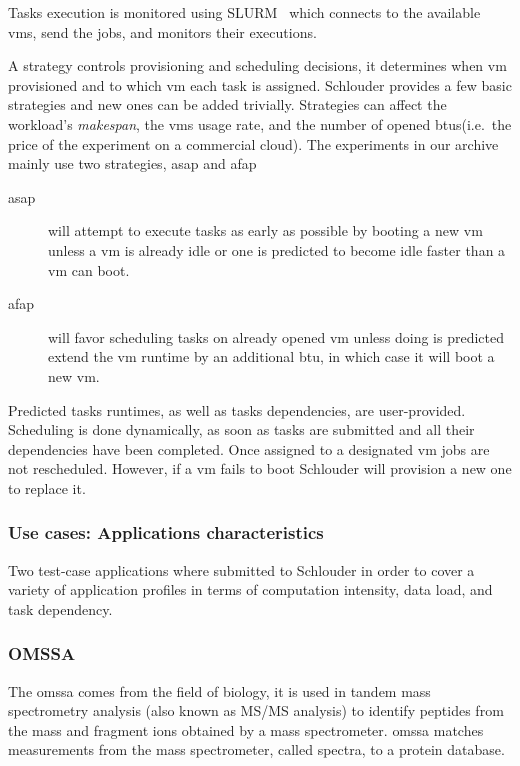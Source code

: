 \documentclass[a4paper,10pt]{article}
\begin{document}
Tasks execution  is monitored using  SLURM~\cite{YooJG03} which connects  to the
available \acp{vm}, send the jobs, and monitors their executions.

A strategy controls provisioning and scheduling decisions, it determines when
\ac{vm} provisioned and to which \ac{vm} each task is assigned. Schlouder
provides a few basic strategies and new ones can be added trivially. Strategies
can affect the workload's \emph{makespan}, the \acp{vm} usage rate, and the
number of opened \acp{btu}(i.e.\ the price of the experiment on a commercial
cloud). The experiments in our archive mainly use two strategies, \ac{asap} and
\ac{afap}

\begin{description}
	\item[\ac{asap}] will attempt to execute tasks as early as possible by
		booting a new \ac{vm} unless a \ac{vm} is already idle or one is
		predicted to become idle faster than a \ac{vm} can boot.
	\item[\ac{afap}] will favor scheduling tasks on already opened \ac{vm}
		unless doing is predicted extend the \ac{vm} runtime by an
		additional \ac{btu}, in which case it will boot a new \ac{vm}.
\end{description}

Predicted tasks runtimes, as well as tasks dependencies, are user-provided.
Scheduling is done dynamically, as soon as tasks are submitted and all their
dependencies have been completed. Once assigned to a designated \ac{vm} jobs are
not rescheduled. However, if a \ac{vm} fails to boot Schlouder will provision a
new one to replace it.

\subsubsection{Use cases: Applications characteristics}

Two test-case applications where submitted to Schlouder in order to cover a
variety of application profiles in terms of computation intensity, data load,
and task dependency.

\subsubsection{OMSSA}

The \ac{omssa}\cite{Geer2004} comes from the field of biology, it is used in tandem mass
spectrometry analysis (also known as MS/MS analysis) to identify peptides from
the mass and fragment ions obtained by a mass spectrometer. \ac{omssa} matches
measurements from the mass spectrometer, called spectra, to a protein database.
\end{document}
